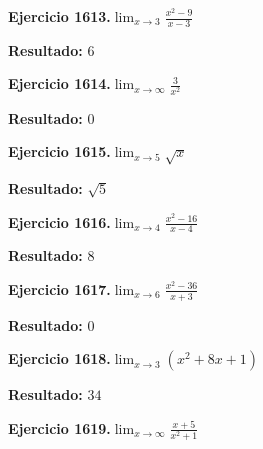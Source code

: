 \documentclass[10pt,a4paper]{article}
\begin{document}
\begin{ejbox}
\textbf{Ejercicio 1613.}\quad $\lim_{x\to 3} \frac{x^2-9}{x-3}$
\end{ejbox}

\begin{solbox}
\textbf{Resultado:} \(\displaystyle 6\)
\end{solbox}

\begin{ejbox}
\textbf{Ejercicio 1614.}\quad $\lim_{x\to \infty} \frac{3}{x^2}$
\end{ejbox}

\begin{solbox}
\textbf{Resultado:} \(\displaystyle 0\)
\end{solbox}

\newpage
\begin{ejbox}
\textbf{Ejercicio 1615.}\quad $\lim_{x\to 5} \sqrt{x}$
\end{ejbox}

\begin{solbox}
\textbf{Resultado:} \(\displaystyle \sqrt{5}\)
\end{solbox}

\begin{ejbox}
\textbf{Ejercicio 1616.}\quad $\lim_{x\to 4} \frac{x^2-16}{x-4}$
\end{ejbox}

\begin{solbox}
\textbf{Resultado:} \(\displaystyle 8\)
\end{solbox}

\begin{ejbox}
\textbf{Ejercicio 1617.}\quad $\lim_{x\to 6} \frac{x^2-36}{x+3}$
\end{ejbox}

\begin{solbox}
\textbf{Resultado:} \(\displaystyle 0\)
\end{solbox}

\newpage
\begin{ejbox}
\textbf{Ejercicio 1618.}\quad $\lim_{x\to 3} (x^2 +8x +1)$
\end{ejbox}

\begin{solbox}
\textbf{Resultado:} \(\displaystyle 34\)
\end{solbox}

\begin{ejbox}
\textbf{Ejercicio 1619.}\quad $\lim_{x\to \infty} \frac{x + 5}{x^2 + 1}$
\end{ejbox}
\end{document}
